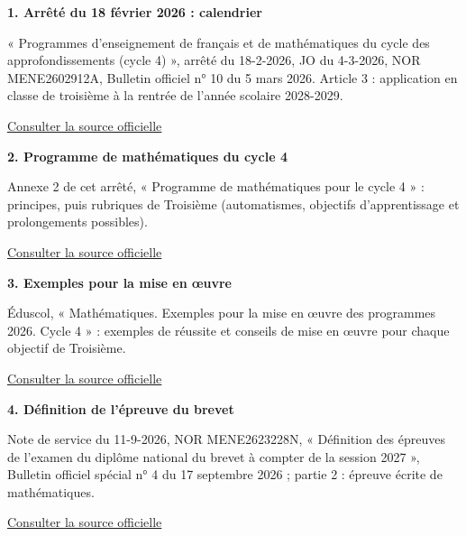 \clearpage\thispagestyle{otFront}\label{references}\fontsize{11}{15}\selectfont
\par\medskip\textbf{1. Arrêté du 18 février 2026 : calendrier}\par « Programmes d’enseignement de français et de mathématiques du cycle des approfondissements (cycle 4) », arrêté du 18-2-2026, JO du 4-3-2026, NOR MENE2602912A, Bulletin officiel n° 10 du 5 mars 2026. Article 3 : application en classe de troisième à la rentrée de l’année scolaire 2028-2029.\par\href{https://www.education.gouv.fr/sites/default/files/document/Bulletin\%20officiel\%20n\%C2\%B0\%2010\%20du\%205\%20mars\%202026-480719.pdf}{\textcolor{otGreenDark}{Consulter la source officielle}}\par
\par\medskip\textbf{2. Programme de mathématiques du cycle 4}\par Annexe 2 de cet arrêté, « Programme de mathématiques pour le cycle 4 » : principes, puis rubriques de Troisième (automatismes, objectifs d’apprentissage et prolongements possibles).\par\href{https://www.education.gouv.fr/sites/default/files/document/Annexe\%202\%20\%E2\%80\%93\%20Programme\%20de\%20math\%C3\%A9matiques\%20pour\%20le\%20cycle\%204-480716.pdf}{\textcolor{otGreenDark}{Consulter la source officielle}}\par
\par\medskip\textbf{3. Exemples pour la mise en œuvre}\par Éduscol, « Mathématiques. Exemples pour la mise en œuvre des programmes 2026. Cycle 4 » : exemples de réussite et conseils de mise en œuvre pour chaque objectif de Troisième.\par\href{https://eduscol.education.gouv.fr/sites/default/files/document/exemple-mise-en-oeuvre-c4-mathematiques0pdf-126080.pdf}{\textcolor{otGreenDark}{Consulter la source officielle}}\par
\par\medskip\textbf{4. Définition de l’épreuve du brevet}\par Note de service du 11-9-2026, NOR MENE2623228N, « Définition des épreuves de l’examen du diplôme national du brevet à compter de la session 2027 », Bulletin officiel spécial n° 4 du 17 septembre 2026 ; partie 2 : épreuve écrite de mathématiques.\par\href{https://www.education.gouv.fr/sites/default/files/document/bulletin-officiel-special-ndeg-4-du-17-septembre-2026-521113.pdf}{\textcolor{otGreenDark}{Consulter la source officielle}}\par
